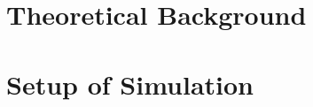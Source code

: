 \documentclass[a4paper,10pt,twoside,ngerman,bibliography=totoc]{scrreprt}
\begin{document}
	\mathswapoff                 %
	\graphicspath{{pics/}}	%
	
	\pagestyle{empty}
	
	\cleardoublepage
	\cleardoublepage
	
	\cleardoublepage
	
	\pagestyle{plain}
	\vspace*{-2cm} 
	\tableofcontents
	\cleardoublepage
	\pagestyle{scrheadings}

	
	\cleardoublepage
	
	
	\cleardoublepage
	\chapter{Theoretical Background}
	
	
	
	\chapter{Setup of Simulation}
	
  \clearpage
  \renewcommand{\bibname}{Bibliography}
  \printbibliography
  \cleardoublepage
	\appendix
	
    
\end{document}
